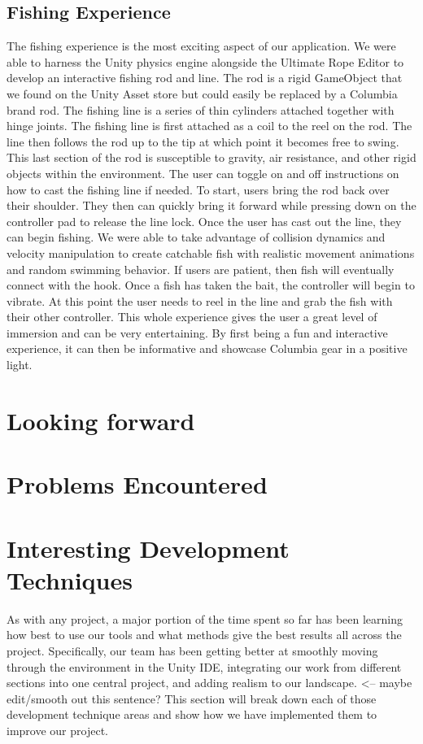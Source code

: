 \documentclass[10pt,journal,compsoc,onecolumn, draftclsnofoot]{IEEEtran}
\begin{document}
\subsection{Fishing Experience}
The fishing experience is the most exciting aspect of our application. We were able to harness the Unity physics engine alongside the Ultimate Rope Editor to develop an interactive fishing rod and line. The rod is a rigid GameObject that we found on the Unity Asset store but could easily be replaced by a Columbia brand rod. The fishing line is a series of thin cylinders attached together with hinge joints. The fishing line is first attached as a coil to the reel on the rod. The line then follows the rod up to the tip at which point it becomes free to swing. This last section of the rod is susceptible to gravity, air resistance, and other rigid objects within the environment. The user can toggle on and off instructions on how to cast the fishing line if needed. To start, users bring the rod back over their shoulder. They then can quickly bring it forward while pressing down on the controller pad to release the line lock. Once the user has cast out the line, they can begin fishing. We were able to take advantage of collision dynamics and velocity manipulation to create catchable fish with realistic movement animations and random swimming behavior. If users are patient, then fish will eventually connect with the hook. Once a fish has taken the bait, the controller will begin to vibrate. At this point the user needs to reel in the line and grab the fish with their other controller. This whole experience gives the user a great level of immersion and can be very entertaining. By first being a fun and interactive experience, it can then be informative and showcase Columbia gear in a positive light.



\section{Looking forward}



\section{Problems Encountered}


\section{Interesting Development Techniques}
As with any project, a major portion of the time spent so far has been learning how best to use our tools and what methods give the best results all across the project.
Specifically, our team has been getting better at smoothly moving through the environment in the Unity IDE, integrating our work from different sections into one central project, and adding realism to our landscape.  <-- maybe edit/smooth out this sentence?
This section will break down each of those development technique areas and show how we have implemented them to improve our project.
\end{document}

